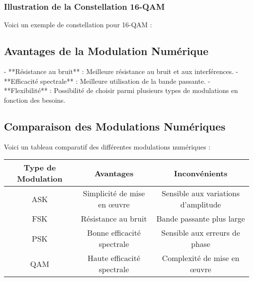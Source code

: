 \documentclass[10pt,a4paper]{article}
\begin{document}
\subsubsection*{Illustration de la Constellation 16-QAM}
Voici un exemple de constellation pour 16-QAM :


\subsection*{Avantages de la Modulation Numérique}
- **Résistance au bruit** : Meilleure résistance au bruit et aux interférences.
- **Efficacité spectrale** : Meilleure utilisation de la bande passante.
- **Flexibilité** : Possibilité de choisir parmi plusieurs types de modulations en fonction des besoins.

\subsection*{Comparaison des Modulations Numériques}
Voici un tableau comparatif des différentes modulations numériques :

\begin{tabular}{|c|c|c|}
\hline
Type de Modulation & Avantages & Inconvénients \\
\hline
ASK & Simplicité de mise en œuvre & Sensible aux variations d'amplitude \\
\hline
FSK & Résistance au bruit & Bande passante plus large \\
\hline
PSK & Bonne efficacité spectrale & Sensible aux erreurs de phase \\
\hline
QAM & Haute efficacité spectrale & Complexité de mise en œuvre \\
\hline
\end{tabular}
\end{document}
